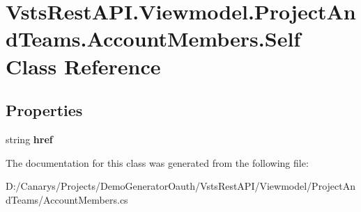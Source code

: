 \hypertarget{class_vsts_rest_a_p_i_1_1_viewmodel_1_1_project_and_teams_1_1_account_members_1_1_self}{}\section{Vsts\+Rest\+A\+P\+I.\+Viewmodel.\+Project\+And\+Teams.\+Account\+Members.\+Self Class Reference}
\label{class_vsts_rest_a_p_i_1_1_viewmodel_1_1_project_and_teams_1_1_account_members_1_1_self}
\subsection*{Properties}
\begin{DoxyCompactItemize}
\item 
\mbox{\label{class_vsts_rest_a_p_i_1_1_viewmodel_1_1_project_and_teams_1_1_account_members_1_1_self_a7878a81e3fa8477336c85dd2c9af9047}} 
string {\bfseries href}
\end{DoxyCompactItemize}


The documentation for this class was generated from the following file\+:\begin{DoxyCompactItemize}
\item 
D\+:/\+Canarys/\+Projects/\+Demo\+Generator\+Oauth/\+Vsts\+Rest\+A\+P\+I/\+Viewmodel/\+Project\+And\+Teams/Account\+Members.\+cs\end{DoxyCompactItemize}
